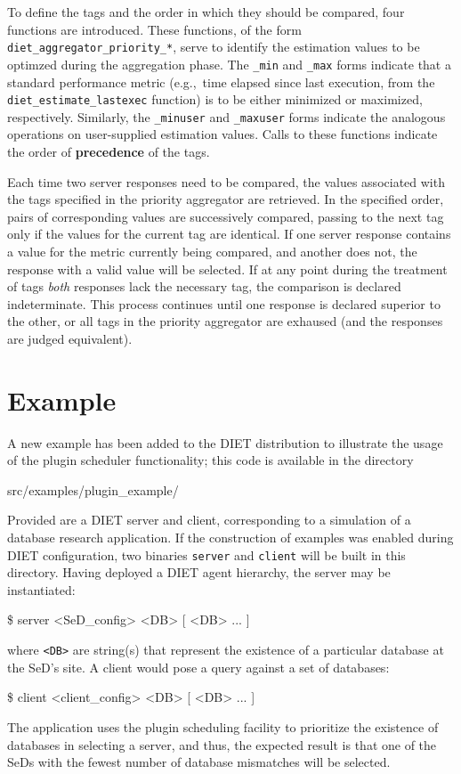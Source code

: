 To define the tags and the order in which they should be compared,
four functions are introduced.  These functions, of the form
\texttt{diet\_aggregator\_priority\_*}, serve to identify the
estimation values to be optimzed during the aggregation phase.  The
\texttt{\_min} and \texttt{\_max} forms indicate that a standard
performance metric (e.g.,~time elapsed since last execution, from the
\texttt{diet\_estimate\_lastexec} function) is to be either
minimized or maximized, respectively.  Similarly, the
\texttt{\_minuser} and \texttt{\_maxuser} forms indicate the analogous
operations on user-supplied estimation values.  Calls to these
functions indicate the order of \textbf{precedence} of the tags.

Each time two server responses need to be compared, the values
associated with the tags specified in the priority aggregator are
retrieved.  In the specified order, pairs of corresponding values are
successively compared, passing to the next tag only if the values for
the current tag are identical.  If one server response contains a
value for the metric currently being compared, and another does not,
the response with a valid value will be selected.  If at any point
during the treatment of tags \emph{both} responses lack the necessary
tag, the comparison is declared indeterminate.
This process continues until one response is
declared superior to the other, or all tags in the priority aggregator
are exhaused (and the responses are judged equivalent).


\section{Example}

A new example has been added to the DIET distribution to illustrate
the usage of the plugin scheduler functionality; this code is
available in the directory
\begin{code}
src/examples/plugin\_example/
\end{code}
Provided are a DIET server and client, corresponding to a simulation
of a database research application.  If the construction of examples
was enabled during DIET configuration, two binaries \texttt{server}
and \texttt{client} will be built in this directory.  Having deployed
a DIET agent hierarchy, the server may be instantiated:
\begin{code}
  \$ server <SeD\_config> <DB> [ <DB> ... ]
\end{code}
where \texttt{<DB>} are string(s) that represent the existence of
a particular database at the SeD's site.  A client would pose a query
against a set of databases:
\begin{code}
  \$ client <client\_config> <DB> [ <DB> ... ]
\end{code}
The application uses the plugin scheduling facility to prioritize the
existence of databases in selecting a server, and thus, the expected
result is that one of the SeDs with the fewest number of database
mismatches will be selected.

